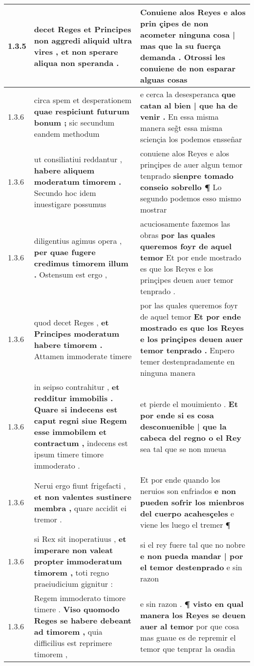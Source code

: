 \begin{tabular}{|p{1cm}|p{6.5cm}|p{6.5cm}|}
1.3.5 & decet Reges et Principes \textbf{ non aggredi aliquid ultra vires , } et non sperare aliqua non speranda . & Conuiene alos Reyes e alos prin çipes \textbf{ de non acometer ninguna cosa | mas que la su fuerça demanda . } Otrossi les conuiene de non esparar alguas cosas \\\hline
1.3.6 & circa spem et desperationem \textbf{ quae respiciunt futurum bonum ; } sic secundum eandem methodum & e cerca la desesperanca \textbf{ que catan al bien | que ha de venir . } En essa misma manera seg̃t essa misma sciençia los podemos ensseñar \\\hline
1.3.6 & ut consiliatiui reddantur , \textbf{ habere aliquem moderatum timorem . } Secundo hoc idem inuestigare possumus & conuiene alos Reyes e alos prinçipes de auer algun temor tenprado \textbf{ sienpre tomado conseio sobrello ¶ } Lo segundo podemos esso mismo mostrar \\\hline
1.3.6 & diligentius agimus opera , \textbf{ per quae fugere credimus timorem illum . } Ostensum est ergo , & acuciosamente fazemos las obras \textbf{ por las quales queremos foyr de aquel temor } Et por ende mostrado es que los Reyes e los prinçipes deuen auer temor tenprado . \\\hline
1.3.6 & quod decet Reges , \textbf{ et Principes moderatum habere timorem . } Attamen immoderate timere & por las quales queremos foyr de aquel temor \textbf{ Et por ende mostrado es que los Reyes e los prinçipes deuen auer temor tenprado . } Enpero temer destenpradamente en ninguna manera \\\hline
1.3.6 & in seipso contrahitur , \textbf{ et redditur immobilis . Quare si indecens est caput regni siue Regem esse immobilem et contractum , } indecens est ipsum timere timore immoderato . & et pierde el mouimiento . \textbf{ Et por ende si es cosa desconuenible | que la cabeca del regno o el Rey } sea tal que se non mueua \\\hline
1.3.6 & Nerui ergo fiunt frigefacti , \textbf{ et non valentes sustinere membra , } quare accidit ei tremor . & Et por ende quando los neruios son enfriados \textbf{ e non pueden sofrir los mienbros del cuerpo acahesçeles } e viene les luego el tremer ¶ \\\hline
1.3.6 & si Rex sit inoperatiuus , \textbf{ et imperare non valeat propter immoderatum timorem , } toti regno praeiudicium gignitur : & si el rey fuere tal que no nobre \textbf{ e non pueda mandar | por el temor destenprado } e sin razon \\\hline
1.3.6 & Regem immoderato timore timere . \textbf{ Viso quomodo Reges se habere debeant ad timorem , } quia difficilius est reprimere timorem , & e sin razon . \textbf{ ¶ visto en qual manera los Reyes se deuen auer al temor } por que cosa mas guaue es de repremir el temor que tenprar la osadia \\\hline

\end{tabular}
